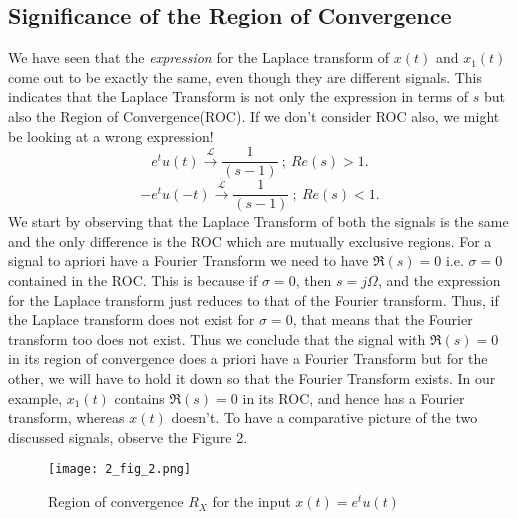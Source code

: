 \subsection{Significance of the Region of Convergence}
We have seen that the \emph{expression} for the Laplace transform of $x(t)$ and $x_1(t)$ come out to be exactly the same, even though they are different signals. This indicates that the Laplace Transform is not only the expression in terms of $s$ but also the Region of Convergence(ROC). If we don't consider ROC also, we might be looking at a wrong expression!
\[
e^{t}u(t) \xrightarrow{\ \mathcal{L}\ } \frac{1}{(s - 1)}\ ;\ Re(s) > 1. \]\[
-e^{t}u(-t) \xrightarrow{\ \mathcal{L}\ } \frac{1}{(s - 1)}\ ;\ Re(s) < 1. 
\]
We start by observing that the Laplace Transform of both the signals is the same and the only difference is the ROC which are mutually exclusive regions. For a signal to apriori have a Fourier Transform we need to have $\Re(s) = 0$ i.e. $\sigma = 0$ contained in the ROC. This is because if $\sigma=0$, then $s=j\Omega$, and the expression for the Laplace transform just reduces to that of the Fourier transform. Thus, if the Laplace transform does not exist for $\sigma=0$, that means that the Fourier transform too does not exist. Thus we conclude that the signal with $\Re(s)=0$ in its region of convergence does a priori have a Fourier Transform but for the other, we will have to hold it down so that the Fourier Transform exists.
In our example, $x_1(t)$ contains $\Re(s)=0$ in its ROC, and hence has a Fourier transform, whereas $x(t)$ doesn't.
To have a comparative picture of the two discussed signals, observe the Figure 2.
\begin{figure}[h!]
\begin{center}
\texttt{[image: 2\_fig\_2.png]}
\end{center}
\caption{Region of convergence $R_X$ for the input  $x(t) = e^{t}u(t)$}
\end{figure}


